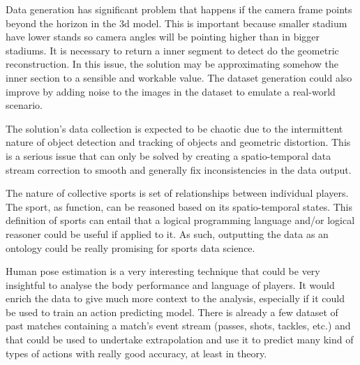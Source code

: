 \documentclass[
11pt,
twoside
]{report}
\begin{document}
Data generation has significant problem that happens if the camera frame points beyond the horizon in the 3d model. This is important because smaller stadium have lower stands so camera angles will be pointing higher than in bigger stadiums. It is necessary to return a inner segment to detect do the geometric reconstruction. In this issue, the solution may be approximating somehow the inner section to a sensible and workable value. The dataset generation could also improve by adding noise to the images in the dataset to emulate a real-world scenario.


The solution's data collection is expected to be chaotic due to the intermittent nature of object detection and tracking of objects and geometric distortion. This is a serious issue that can only be solved by creating a spatio-temporal data stream correction to smooth and generally fix inconsistencies in the data output.


The nature of collective sports is set of relationships between individual players. The sport, as function, can be reasoned based on its spatio-temporal states. This definition of sports can entail that a logical programming language and/or logical reasoner could be useful if applied to it. As such, outputting the data as an ontology could be really promising for sports data science.


Human pose estimation is a very interesting technique that could be very insightful to analyse the body performance and language of players. It would enrich the data to give much more context to the analysis, especially if it could be used to train an action predicting model. There is already a few dataset of past matches containing a match's event stream (passes, shots, tackles, etc.) and that could be used to undertake extrapolation and use it to predict many kind of types of actions with really good accuracy, at least in theory.
\end{document}

